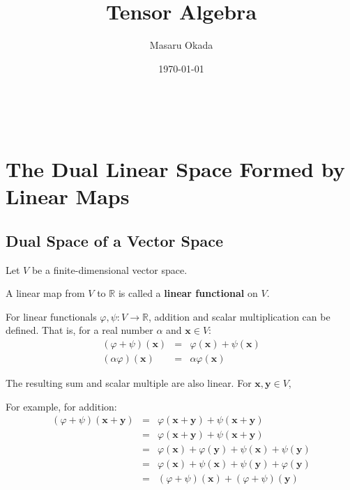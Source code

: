 \documentclass[uplatex,a4j,12pt,dvipdfmx]{jsarticle}
\title{
Tensor Algebra
}
\author{Masaru Okada}
\date{\today}
\begin{document}
\maketitle

\tableofcontents

\ \\

\section{The Dual Linear Space Formed by Linear Maps}

\subsection{Dual Space of a Vector Space}

Let $V$ be a finite-dimensional vector space.

A linear map from $V$ to $\mathbb{R}$ is called a \textbf{linear functional} on $V$.

For linear functionals $\varphi, \psi : V \to \mathbb{R}$,
addition and scalar multiplication can be defined.
That is, for a real number $\alpha$ and
$\mathbf{x} \in V$:
\[
	\begin{array}{rcl}
		(\varphi + \psi) (\mathbf{x}) & = & \varphi (\mathbf{x}) + \psi (\mathbf{x})
		\\
		(\alpha \varphi) (\mathbf{x}) & = & \alpha \varphi (\mathbf{x})
	\end{array}
\]

The resulting sum and scalar multiple are also linear.
For $\mathbf{x}, \mathbf{y} \in V$,

For example, for addition:
\[
	\begin{array}{rcl}
		(\varphi + \psi) (\mathbf{x} + \mathbf{y}) & = & \varphi (\mathbf{x} + \mathbf{y}) + \psi (\mathbf{x} + \mathbf{y})
		\\
		                                           & = &
		\varphi (\mathbf{x} + \mathbf{y}) + \psi (\mathbf{x} + \mathbf{y})
		\\
		                                           & = &
		\varphi (\mathbf{x}) + \varphi (\mathbf{y})
		+
		\psi (\mathbf{x}) + \psi (\mathbf{y})
		\\
		                                           & = &
		\varphi (\mathbf{x}) + \psi (\mathbf{x})
		+ \psi (\mathbf{y}) + \varphi (\mathbf{y})
		\\
		                                           & = &
		(\varphi + \psi) (\mathbf{x}) + (\varphi + \psi) (\mathbf{y})
	\end{array}
\]
\end{document}
